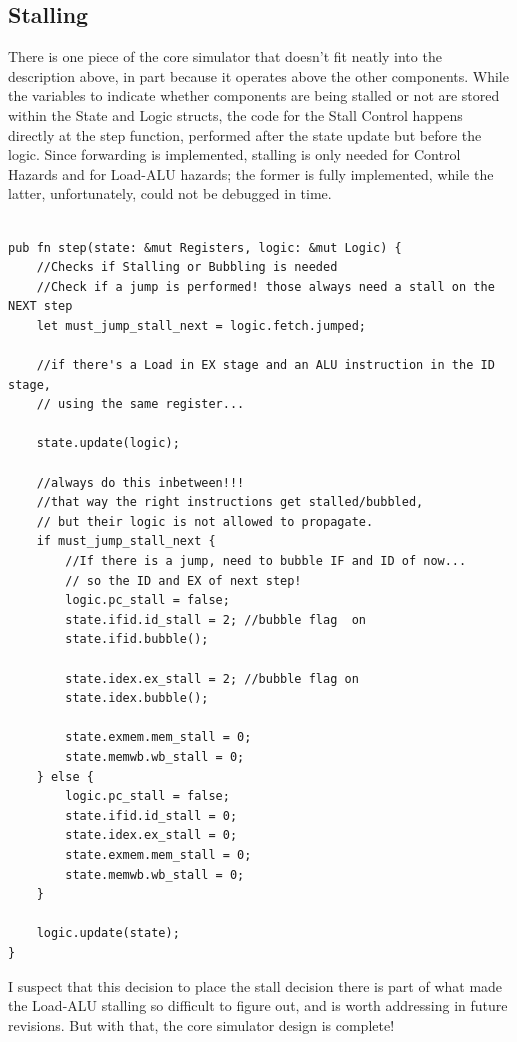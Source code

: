 \documentclass[12pt,twoside]{reedthesis}
\begin{document}
\subsection*{Stalling}

There is one piece of the core simulator that doesn't fit neatly into the description above, in part because it operates above the other components. While the variables to indicate whether components are being stalled or not are stored within the State and Logic structs, the code for the Stall Control happens directly at the step function, performed after the state update but before the logic. Since forwarding is implemented, stalling is only needed for Control Hazards and for Load-ALU hazards; the former is fully implemented, while the latter, unfortunately, could not be debugged in time.

\begin{lstlisting}

pub fn step(state: &mut Registers, logic: &mut Logic) {
    //Checks if Stalling or Bubbling is needed
    //Check if a jump is performed! those always need a stall on the NEXT step
    let must_jump_stall_next = logic.fetch.jumped;

    //if there's a Load in EX stage and an ALU instruction in the ID stage,
	// using the same register...

    state.update(logic);

    //always do this inbetween!!!
	//that way the right instructions get stalled/bubbled,
	// but their logic is not allowed to propagate.
    if must_jump_stall_next {
        //If there is a jump, need to bubble IF and ID of now...
		// so the ID and EX of next step!
        logic.pc_stall = false;
        state.ifid.id_stall = 2; //bubble flag  on
        state.ifid.bubble();

        state.idex.ex_stall = 2; //bubble flag on
        state.idex.bubble();

        state.exmem.mem_stall = 0;
        state.memwb.wb_stall = 0;
    } else {
        logic.pc_stall = false;
        state.ifid.id_stall = 0;
        state.idex.ex_stall = 0;
        state.exmem.mem_stall = 0;
        state.memwb.wb_stall = 0;
    }

    logic.update(state);
}
\end{lstlisting}

I suspect that this decision to place the stall decision there is part of what made the Load-ALU stalling so difficult to figure out, and is worth addressing in future revisions. But with that, the core simulator design is complete!
\end{document}
